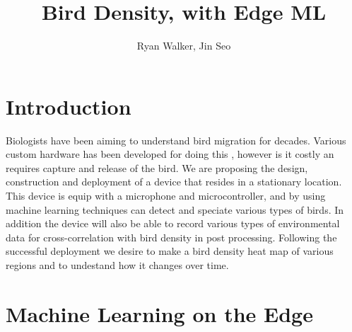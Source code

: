 \documentclass{article}
\begin{document}
\title{Bird Density, with Edge ML}
\author{Ryan Walker, Jin Seo}

\maketitle


\section{Introduction}
Biologists have been aiming to understand bird migration for decades. Various custom hardware has been developed for doing this \cite{BirdTracking}, however is it costly an requires capture and release of the bird. We are proposing the design, construction and deployment of a device that resides in a stationary location. This device is equip with a microphone and microcontroller, and by using machine learning techniques \cite{ML1} \cite{ML2} can detect and speciate various types of birds. In addition the device will also be able to record various types of environmental data for cross-correlation with bird density in post processing. Following the successful deployment we desire to make a bird density heat map of various regions and to undestand how it changes over time.

\section{Machine Learning on the Edge}
\begin{center}
\end{center}
\end{document}
